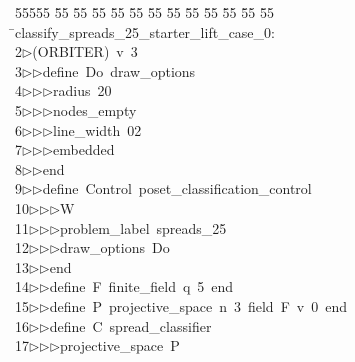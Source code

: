 %
%
\begin{tabbing}
55555 \= 55 \= 55 \= 55 \= 55 \= 55 \= 55 \= 55 \= 55 \= 55 \= 55 \= 55 \= 55 \= \>classify\_spreads\_25\_starter\_lift\_case\_0:\\[0pt]
2\>$\triangleright$\>(ORBITER)\ v\ 3\ \\[0pt]
3\>$\triangleright$\>$\triangleright$\>define\ Do\ draw\_options\ \\[0pt]
4\>$\triangleright$\>$\triangleright$\>$\triangleright$\>radius\ 20\ \\[0pt]
5\>$\triangleright$\>$\triangleright$\>$\triangleright$\>nodes\_empty\ \\[0pt]
6\>$\triangleright$\>$\triangleright$\>$\triangleright$\>line\_width\ 02\ \\[0pt]
7\>$\triangleright$\>$\triangleright$\>$\triangleright$\>embedded\ \\[0pt]
8\>$\triangleright$\>$\triangleright$\>end\ \\[0pt]
9\>$\triangleright$\>$\triangleright$\>define\ Control\ poset\_classification\_control\ \\[0pt]
10\>$\triangleright$\>$\triangleright$\>$\triangleright$\>W\ \\[0pt]
11\>$\triangleright$\>$\triangleright$\>$\triangleright$\>problem\_label\ spreads\_25\ \\[0pt]
12\>$\triangleright$\>$\triangleright$\>$\triangleright$\>draw\_options\ Do\ \\[0pt]
13\>$\triangleright$\>$\triangleright$\>end\ \\[0pt]
14\>$\triangleright$\>$\triangleright$\>define\ F\ finite\_field\ q\ 5\ end\ \\[0pt]
15\>$\triangleright$\>$\triangleright$\>define\ P\ projective\_space\ n\ 3\ field\ F\ v\ 0\ end\ \\[0pt]
16\>$\triangleright$\>$\triangleright$\>define\ C\ spread\_classifier\ \\[0pt]
17\>$\triangleright$\>$\triangleright$\>$\triangleright$\>projective\_space\ P\ \\[0pt]

\end{tabbing}
